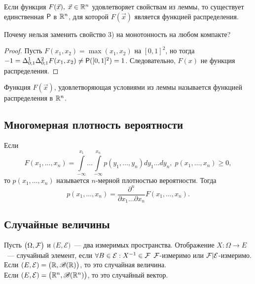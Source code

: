 \begin{theorem}
	Если функция $F(\vec x),\; \vec x \in \R^n$ удовлетворяет свойствам из леммы, то существует единственная $\P$ в $\R^n$, для которой $F(\vec x)$ является функцией распределения.
\end{theorem}
\begin{note}
	Почему нельзя заменить свойство 3) на монотонность на любом компакте? 
	\begin{proof}
		Пусть $F(x_1, x_2) = \max(x_1, x_2)$ на $[0, 1]^2$, но тогда $-1 = \Delta_{0; 1}^1 \Delta_{0; 1}^2 F(x_1, x_2) \neq \P([0, 1]^2) = 1$. Следовательно, $F(x)$ не функция распределения.
	\end{proof}
\end{note}
\begin{definition}
	Функция $F(\vec x)$, удовлетворяющая условиями из леммы называется функцией распределения в $\R^n$.
\end{definition}
\subsection{Многомерная плотность вероятности}
\begin{definition}
	Если 
	$$ F(x_1, \ldots, x_n) = \int\limits_{-\infty}^{x_1}\ldots\int\limits_{-\infty}^{x_n} p(y_1, \ldots, y_n)dy_1\ldots dy_n,\; p(x_1, \ldots, x_n) \geqslant 0, $$ 
	то $p(x_1, \ldots, x_n)$ называется $n$-мерной плотностью вероятности. Тогда
	$$ p(x_1, \ldots, x_n) = \frac{\partial^n}{\partial x_1\ldots\partial x_n}F(x_1, \ldots, x_n). $$
\end{definition}
\subsection{Случайные величины}
\begin{definition}
	Пусть $\big(\Omega, \F \big)$ и $\big( E, \mathcal{E} \big)$~--- два измеримых пространства. Отображение $X: \Omega \rightarrow E$~--- случайный элемент, если $\forall B \in \mathcal{E}: X^{-1} \in \F$ $\F$-измеримо или $\F|\mathcal{E}$-измеримо. \\
	Если $(E, \mathcal{E}) = \big(\R, \B(\R)\big)$, то это случайная величина. \\
	Если $(E, \mathcal{E}) = \big(\R^n, \B(\R^n)\big)$, то это случайный вектор.
\end{definition}

